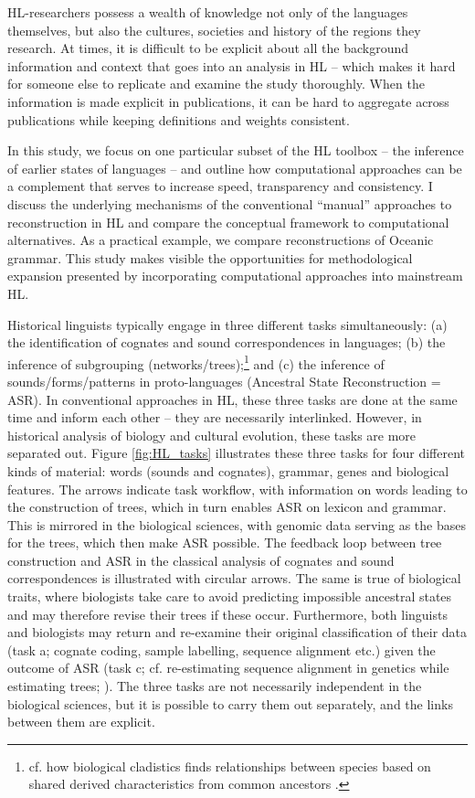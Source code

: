 \documentclass[12pt,letterpaper]{article}
\begin{document}
HL-researchers possess a wealth of knowledge not only of the languages themselves, but also the cultures, societies and history of the regions they research. At times, it is difficult to be explicit about all the background information and context that goes into an analysis in HL -- which makes it hard for someone else to replicate and examine the study thoroughly. When the information is made explicit in publications, it can be hard to aggregate across publications while keeping definitions and weights consistent.

In this study, we focus on one particular subset of the HL toolbox -- the inference of earlier states of languages -- and outline how computational approaches can be a complement that serves to increase speed, transparency and consistency. I discuss the underlying mechanisms of the conventional ``manual'' approaches to reconstruction in HL and compare the conceptual framework to computational alternatives. As a practical example, we compare reconstructions of Oceanic grammar. This study makes visible the opportunities for methodological expansion presented by incorporating computational approaches into mainstream HL.

Historical linguists typically engage in three different tasks simultaneously: (a) the identification of cognates and sound correspondences in languages; (b) the inference of subgrouping (networks/trees);\footnote{cf. how biological cladistics finds relationships between species based on shared derived characteristics from common ancestors \citep[16--17]{maclaurin2008biodiversity}.} and (c) the inference of sounds/forms/patterns in proto-languages (Ancestral State Reconstruction = ASR). In conventional approaches in HL, these three tasks are done at the same time and inform each other -- they are necessarily interlinked. However, in historical analysis of biology and cultural evolution, these tasks are more separated out. Figure \ref{fig:HL_tasks} illustrates these three tasks for four different kinds of material: words (sounds and cognates), grammar, genes and biological features. The arrows indicate task workflow, with information on words leading to the construction of trees, which in turn enables ASR on lexicon and grammar. This is mirrored in the biological sciences, with genomic data serving as the bases for the trees, which then make ASR possible. The feedback loop between tree construction and ASR in the classical analysis of cognates and sound correspondences is illustrated with circular arrows. The same is true of biological traits, where biologists take care to avoid predicting impossible ancestral states \citep{schulmeister2004comparative} and may therefore revise their trees if these occur. Furthermore, both linguists and biologists may return and re-examine their original classification of their data (task a; cognate coding, sample labelling, sequence alignment etc.) given the outcome of ASR (task c; cf. re-estimating sequence alignment in genetics while estimating trees; \citealt{Redelings_2021_BAli-Phy}). The three tasks are not necessarily independent in the biological sciences, but it is possible to carry them out separately, and the links between them are explicit. 
\end{document}
